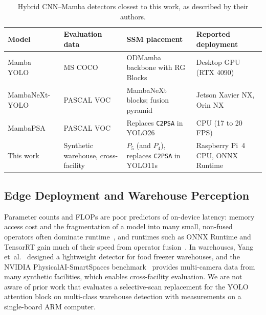 \begin{table}[!t]
\caption{Hybrid CNN--Mamba detectors closest to this work, as described by their authors.}
\label{tab:lit_comparison}
\centering
\footnotesize
\setlength{\tabcolsep}{3pt}
\begin{tabularx}{\textwidth}{>{\raggedright\arraybackslash}p{2.3cm} >{\raggedright\arraybackslash}p{2.1cm} >{\raggedright\arraybackslash}X >{\raggedright\arraybackslash}p{2.9cm}}
\toprule
\textbf{Model} & \textbf{Evaluation data} & \textbf{SSM placement} & \textbf{Reported deployment} \\
\midrule
Mamba YOLO~\cite{wang2025mambayolo} & MS COCO & ODMamba backbone with RG Blocks & Desktop GPU (RTX 4090) \\
MambaNeXt-YOLO~\cite{lei2025mambanext} & PASCAL VOC & MambaNeXt blocks; fusion pyramid & Jetson Xavier NX, Orin NX \\
MambaPSA~\cite{chan2026mambapsa} & PASCAL VOC & Replaces \texttt{C2PSA} in YOLO26 & CPU (17 to 20 FPS) \\
\midrule
This work & Synthetic warehouse, cross-facility & $P_5$ (and $P_4$), replaces \texttt{C2PSA} in YOLO11s & Raspberry Pi~4 CPU, ONNX Runtime \\
\bottomrule
\end{tabularx}
\end{table}

\subsection{Edge Deployment and Warehouse Perception}
Parameter counts and FLOPs are poor predictors of on-device latency: memory access cost and the fragmentation of a model into many small, non-fused operators often dominate runtime~\cite{ma2018shufflenetv2,mittal2024lightweightsurvey}, and runtimes such as ONNX Runtime and TensorRT gain much of their speed from operator fusion~\cite{ratul2024accelerating}. In warehouses, Yang et~al.~\cite{yang2024freezerwarehouse} designed a lightweight detector for food freezer warehouses, and the NVIDIA PhysicalAI-SmartSpaces benchmark~\cite{wang2026smartspaces} provides multi-camera data from many synthetic facilities, which enables cross-facility evaluation. We are not aware of prior work that evaluates a selective-scan replacement for the YOLO attention block on multi-class warehouse detection with measurements on a single-board ARM computer.
